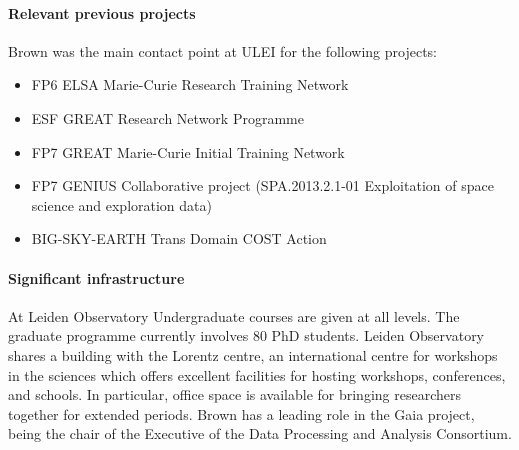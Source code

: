 \paragraph{Relevant previous projects}
Brown was the main contact point at ULEI for the following projects:
\begin{itemize}
    \item FP6 ELSA Marie-Curie Research Training Network
    \item ESF GREAT Research Network Programme 
    \item FP7 GREAT Marie-Curie Initial Training Network
    \item FP7 GENIUS Collaborative project (SPA.2013.2.1-01 Exploitation of space science and exploration data)
    \item BIG-SKY-EARTH Trans Domain COST Action
\end{itemize}

\paragraph{Significant infrastructure}
At Leiden Observatory Undergraduate courses are given at all levels. The 
graduate programme currently involves 80 PhD students. Leiden 
Observatory shares a building with the Lorentz centre, an international 
centre for workshops in the sciences which offers excellent facilities for 
hosting workshops, conferences, and schools. In particular, office space is 
available for bringing researchers together for extended periods. 
Brown has a leading role in the Gaia project, being the chair of the 
Executive of the Data Processing and Analysis Consortium. 